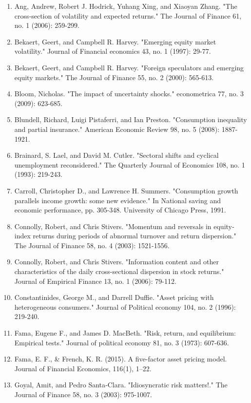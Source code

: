 \documentclass[12pt]{article}
\begin{document}
\begin{enumerate}
    \item{Ang, Andrew, Robert J. Hodrick, Yuhang Xing, and Xiaoyan Zhang. "The cross‐section of volatility and expected returns." The Journal of Finance 61, no. 1 (2006): 259-299.}
    \item{Bekaert, Geert, and Campbell R. Harvey. "Emerging equity market volatility." Journal of Financial economics 43, no. 1 (1997): 29-77.}
    \item{Bekaert, Geert, and Campbell R. Harvey. "Foreign speculators and emerging equity markets." The Journal of Finance 55, no. 2 (2000): 565-613.}
    \item{Bloom, Nicholas. "The impact of uncertainty shocks." econometrica 77, no. 3 (2009): 623-685.}
    \item{Blundell, Richard, Luigi Pistaferri, and Ian Preston. "Consumption inequality and partial insurance." American Economic Review 98, no. 5 (2008): 1887-1921.}
    \item{Brainard, S. Lael, and David M. Cutler. "Sectoral shifts and cyclical unemployment reconsidered." The Quarterly Journal of Economics 108, no. 1 (1993): 219-243.}
    \item{Carroll, Christopher D., and Lawrence H. Summers. "Consumption growth parallels income growth: some new evidence." In National saving and economic performance, pp. 305-348. University of Chicago Press, 1991.}
    \item{Connolly, Robert, and Chris Stivers. "Momentum and reversals in equity‐index returns during periods of abnormal turnover and return dispersion." The Journal of Finance 58, no. 4 (2003): 1521-1556.}
    \item{Connolly, Robert, and Chris Stivers. "Information content and other characteristics of the daily cross-sectional dispersion in stock returns." Journal of Empirical Finance 13, no. 1 (2006): 79-112.}
    \item{Constantinides, George M., and Darrell Duffie. "Asset pricing with heterogeneous consumers." Journal of Political economy 104, no. 2 (1996): 219-240.}
    \item {Fama, Eugene F., and James D. MacBeth. "Risk, return, and equilibrium: Empirical tests." Journal of political economy 81, no. 3 (1973): 607-636.}
    \item {Fama, E. F., \& French, K. R. (2015). A five-factor asset pricing model. Journal of Financial Economics, 116(1), 1–22. }
    \item{Goyal, Amit, and Pedro Santa‐Clara. "Idiosyncratic risk matters!." The Journal of Finance 58, no. 3 (2003): 975-1007.}

\end{enumerate}
\end{document}
